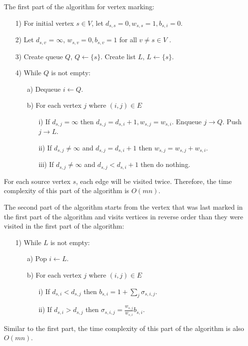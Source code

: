 \documentclass[11pt]{article}
\begin{document}
The first part of the algorithm for vertex marking:
\begin{itemize}
  \item [1)] For initial vertex $s \in V$, let $d_{s,s}=0, w_{s,s}=1, b_{s,i}=0$.
  \item [2)] Let $d_{s,v}$ = $\infty$, $w_{s,v}=0, b_{s,v}=1$ for all $v \neq s \in V$ .
  \item [3)] Create queue $Q$, $Q \leftarrow \{s\}$. Create list $L$, $L \leftarrow \{s\}$.
  \item [4)] While $Q$ is not empty:
        \begin{itemize}
          \item [a)] Dequeue $i \leftarrow Q$.
          \item [b)] For each vertex $j$ where $(i,j)\in E$
                \begin{itemize}
                  \item [i)]   If $d_{s,j}=\infty$ then $d_{s,j} = d_{s,i}+1, w_{s,j} = w_{s,i}$. Enqueue $j \rightarrow Q$. Push $j \rightarrow L$.
                  \item [ii)]  If $d_{s,j} \neq \infty$ and $d_{s,j} = d_{s,i}+1$ then $w_{s,j} = w_{s,j}+w_{s,i}$.
                  \item [iii)] If $d_{s,j} \neq \infty$ and $d_{s,j} < d_{s,i}+1$ then do nothing.
                \end{itemize}
        \end{itemize}
\end{itemize}
For each source vertex $s$, each edge will be visited twice. Therefore, the time complexity of this part of the algorithm is $O(mn)$.

\noindent The second part of the algorithm starts from the vertex that was last marked in the first part of the algorithm and visits vertices in reverse order than they were visited in the first part of the algorithm:
\begin{itemize}
  \item [1)] While $L$ is not empty:
        \begin{itemize}
          \item [a)] Pop $i \leftarrow L$.
          \item [b)] For each vertex $j$ where $(i,j)\in E$
                \begin{itemize}
                  \item [i)]  If $d_{s,i} < d_{s,j}$ then $b_{s,i} = 1+\sum_{j}\sigma_{s,i,j}$.
                  \item [ii)] If $d_{s,i} > d_{s,j}$ then $\sigma_{s,i,j} = \frac{w_{s,j}}{w_{s,i}}b_{s,i}$.
                \end{itemize}
        \end{itemize}
\end{itemize}
Similar to the first part, the time complexity of this part of the algorithm is also $O(mn)$.
\end{document}
